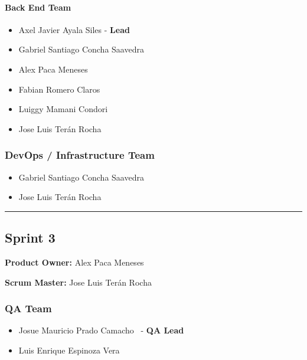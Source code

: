 \documentclass{article}
\providecommand{\tightlist}{
  \setlength{\itemsep}{0pt}\setlength{\parskip}{0pt}}
\begin{document}
\paragraph{Back End Team}\label{back-end-team-2}

\begin{itemize}
\tightlist
\item
  Axel Javier Ayala Siles - \textbf{Lead}
\item
  Gabriel Santiago Concha Saavedra
\item
  Alex Paca Meneses
\item
  Fabian Romero Claros
\item
  Luiggy Mamani Condori
\item
  Jose Luis Terán Rocha
\end{itemize}

\subsubsection{DevOps / Infrastructure Team}\label{devops-team-2}

\begin{itemize}
\tightlist
\item
  Gabriel Santiago Concha Saavedra
\item
  Jose Luis Terán Rocha
\end{itemize}

\begin{center}\rule{0.5\linewidth}{0.5pt}\end{center}

\hypertarget{sprint3}{
\subsection{\texorpdfstring{\textbf{Sprint
3}}{Sprint 3}}\label{sprint3}}

\textbf{Product Owner:}
Alex Paca Meneses

\textbf{Scrum Master:}
Jose Luis Terán Rocha

\hypertarget{qateam-3}{
\subsubsection{\texorpdfstring{\textbf{QA Team}}{QA Team}}\label{qateam-3}}

\begin{itemize}
\tightlist
\item
  Josue Mauricio Prado Camacho ~- \textbf{QA Lead}
\item
  Luis Enrique Espinoza Vera
\end{itemize}
\end{document}
